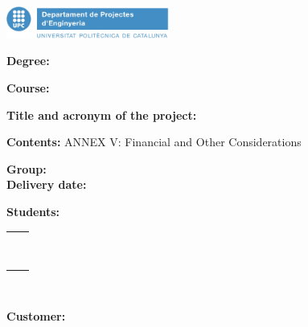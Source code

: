
\thispagestyle{CoverPage}

\includegraphics[width=0.4\textwidth]{./doc_config/images/UPC_ProjectesEng1.png}

\hspace{30pt} {\scriptsize \textbf{\Seccio}}

\vspace{20pt}

\textbf{Degree:} \Degree

\textbf{Course:} \Course

\vspace{50pt}

\textbf{Title and acronym of the project:}

\hspace{10pt} \ProjectName

\hspace{10pt} \Acronym

\vspace{40pt}

\textbf{Contents:} ANNEX V: Financial and Other Considerations

\vspace{20pt}

\textbf{Group:} \GrCode\\

\textbf{Delivery date:} \DocDate\\

\vspace{20pt}

\textbf{Students:}\vspace{7pt}

\begin{tabular}{ll}
	\Studi    \hspace*{30pt} & \Studii   \\
	\Studiii  \hspace*{30pt} & \Studiv   \\
	\Studv    \hspace*{30pt} & \Studvi   \\
	\Studvii  \hspace*{30pt} & \Studviii \\
	\Studix   \hspace*{30pt} & \Studx    \\
	\Studxi   \hspace*{30pt} & \Studxii  \\
	\Studxiii \hspace*{30pt} & \Studxiv  \\
	\Studxv   \hspace*{30pt} & \Studxvi  \\
	\Studxvii  \\
	
\end{tabular}\\

\vspace{15pt}

\textbf{Customer:} \Customer